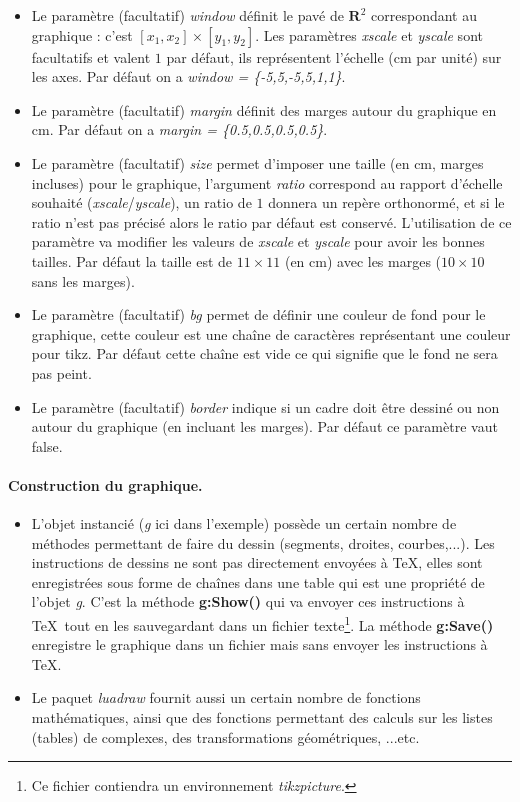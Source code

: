 \documentclass[%
10pt,%
a4paper,%
french,%
]%
{article}%
\begin{document}
\begin{itemize}
 \item Le paramètre (facultatif) \emph{window} définit le pavé de $\mathbf R^2$ correspondant au graphique : c'est $[x_1,x_2]\times[y_1,y_2]$. Les paramètres \emph{xscale} et \emph{yscale} sont facultatifs et valent $1$ par défaut, ils représentent l'échelle (cm par unité) sur les axes. Par défaut on a \emph{window = \{-5,5,-5,5,1,1\}}.
\item Le paramètre (facultatif) \emph{margin} définit des marges autour du graphique en cm. Par défaut on a \emph{margin = \{0.5,0.5,0.5,0.5\}}.
\item Le paramètre (facultatif) \emph{size} permet d'imposer une taille (en cm, marges incluses) pour le graphique, l'argument \emph{ratio} correspond au rapport d'échelle souhaité (\emph{xscale}/\emph{yscale}), un ratio de $1$ donnera un repère orthonormé, et si le ratio n'est pas précisé alors le ratio par défaut est conservé. L'utilisation de ce paramètre va modifier les valeurs de \emph{xscale} et \emph{yscale} pour avoir les bonnes tailles. Par défaut la taille est de $11\times11$ (en cm) avec les marges ($10\times10$ sans les marges).
\item Le paramètre (facultatif) \emph{bg} permet de définir une couleur de fond pour le graphique, cette couleur est une chaîne de caractères représentant une couleur pour tikz. Par défaut cette chaîne est vide ce qui signifie que le fond ne sera pas peint.
\item Le paramètre (facultatif) \emph{border} indique si un cadre doit être dessiné ou non autour du graphique (en incluant les marges). Par défaut ce paramètre vaut false.
\end{itemize}

\paragraph{Construction du graphique.}

\begin{itemize}
    \item L'objet instancié (\emph{g} ici dans l'exemple) possède un certain nombre de méthodes permettant de faire du dessin (segments, droites, courbes,...). Les instructions de dessins ne sont pas directement envoyées à \TeX, elles sont enregistrées sous forme de chaînes dans une table qui est une propriété de l'objet \emph{g}. C'est la méthode \textbf{g:Show()} qui va envoyer ces instructions à \TeX\ tout en les sauvegardant dans un fichier texte\footnote{Ce fichier contiendra un environnement \emph{tikzpicture}.}. La méthode \textbf{g:Save()} enregistre le graphique dans un fichier mais sans envoyer les instructions à \TeX.
    \item Le paquet \emph{luadraw} fournit aussi un certain nombre de fonctions mathématiques, ainsi que des fonctions permettant des calculs sur les listes (tables) de complexes, des transformations géométriques, ...etc.
\end{itemize}
\end{document}
